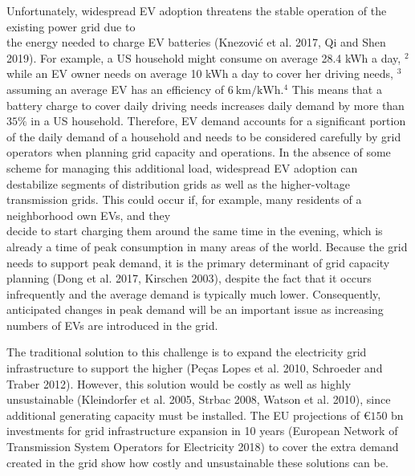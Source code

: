 \documentclass[10pt]{article}
\begin{document}
Unfortunately, widespread EV adoption threatens the stable operation of the existing power grid due to\\
the energy needed to charge EV batteries (Knezović et al. 2017, Qi and Shen 2019). For example, a US household might consume on average 28.4 kWh a day, ${ }^{2}$ while an EV owner needs on average 10 kWh a day to cover her driving needs, ${ }^{3}$ assuming an average EV has an efficiency of $6 \mathrm{~km} / \mathrm{kWh} .^{4}$ This means that a battery charge to cover daily driving needs increases daily demand by more than $35 \%$ in a US household. Therefore, EV demand accounts for a significant portion of the daily demand of a household and needs to be considered carefully by grid operators when planning grid capacity and operations. In the absence of some scheme for managing this additional load, widespread EV adoption can destabilize segments of distribution grids as well as the higher-voltage transmission grids. This could occur if, for example, many residents of a neighborhood own EVs, and they\\
decide to start charging them around the same time in the evening, which is already a time of peak consumption in many areas of the world. Because the grid needs to support peak demand, it is the primary determinant of grid capacity planning (Dong et al. 2017, Kirschen 2003), despite the fact that it occurs infrequently and the average demand is typically much lower. Consequently, anticipated changes in peak demand will be an important issue as increasing numbers of EVs are introduced in the grid.

The traditional solution to this challenge is to expand the electricity grid infrastructure to support the higher (Peças Lopes et al. 2010, Schroeder and Traber 2012). However, this solution would be costly as well as highly unsustainable (Kleindorfer et al. 2005, Strbac 2008, Watson et al. 2010), since additional generating capacity must be installed. The EU projections of $€ 150$ bn investments for grid infrastructure expansion in 10 years (European Network of Transmission System Operators for Electricity 2018) to cover the extra demand created in the grid show how costly and unsustainable these solutions can be.
\end{document}
